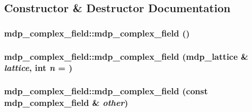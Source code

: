 \subsection{Constructor \& Destructor Documentation}
\hypertarget{classmdp__complex__field_aa629a99588ce79fe33fafb6db4f8226a}{
\subsubsection[{mdp\_\-complex\_\-field}]{\setlength{\rightskip}{0pt plus 5cm}mdp\_\-complex\_\-field::mdp\_\-complex\_\-field ()}}
\label{classmdp__complex__field_aa629a99588ce79fe33fafb6db4f8226a}
\hypertarget{classmdp__complex__field_a26b3b0f65609dd18e7438329ff651fd1}{
\subsubsection[{mdp\_\-complex\_\-field}]{\setlength{\rightskip}{0pt plus 5cm}mdp\_\-complex\_\-field::mdp\_\-complex\_\-field ({\bf mdp\_\-lattice} \& {\em lattice}, \/  int {\em n} = {})}}
\label{classmdp__complex__field_a26b3b0f65609dd18e7438329ff651fd1}
\hypertarget{classmdp__complex__field_a68da5a2521de552a614831c39a14930a}{
\subsubsection[{mdp\_\-complex\_\-field}]{\setlength{\rightskip}{0pt plus 5cm}mdp\_\-complex\_\-field::mdp\_\-complex\_\-field (const {\bf mdp\_\-complex\_\-field} \& {\em other})}}
\label{classmdp__complex__field_a68da5a2521de552a614831c39a14930a}


